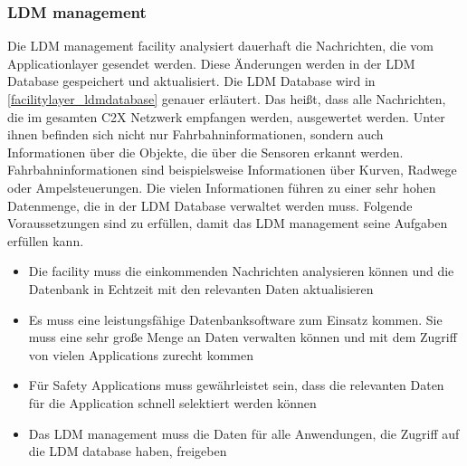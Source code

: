 \subsubsection{LDM management \label{facilitylayer_LDMManagement}}
Die \ac{LDM} management facility analysiert dauerhaft die Nachrichten, die vom Applicationlayer gesendet werden. Diese Änderungen werden in der \ac{LDM} Database gespeichert und aktualisiert. Die LDM Database wird in \autoref{facilitylayer_ldmdatabase} genauer erläutert. Das heißt, dass alle Nachrichten, die im gesamten \ac{C2X} Netzwerk empfangen werden, ausgewertet werden. Unter ihnen befinden sich nicht nur Fahrbahninformationen,  sondern auch Informationen über die Objekte, die über die Sensoren erkannt werden. Fahrbahninformationen sind beispielsweise Informationen über Kurven, Radwege oder Ampelsteuerungen. Die vielen Informationen führen zu einer sehr hohen Datenmenge, die in der \ac{LDM} Database verwaltet werden muss.  Folgende Voraussetzungen sind zu erfüllen, damit das \ac{LDM} management seine Aufgaben erfüllen kann.
\begin{itemize}
	\item Die facility muss die einkommenden Nachrichten analysieren können und die Datenbank in Echtzeit mit den relevanten Daten aktualisieren

	\item Es muss eine leistungsfähige Datenbanksoftware zum Einsatz kommen. Sie muss eine sehr große Menge an Daten verwalten können und mit dem Zugriff von vielen Applications zurecht kommen 
	
	\item Für Safety Applications muss gewährleistet sein, dass die relevanten Daten für die Application schnell selektiert werden können

	\item Das \ac{LDM} management  muss die Daten für alle Anwendungen, die  Zugriff auf die \ac{LDM} database haben, freigeben
\end{itemize}

